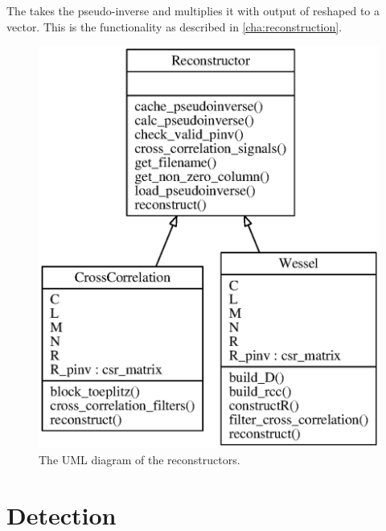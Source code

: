 \documentclass[a4paper, openany, oneside]{memoir}
\begin{document}
The  takes the pseudo-inverse and multiplies it with output of  reshaped to a vector. This is the functionality as described in \cref{cha:reconstruction}.

\begin{figure}
    \centering
    \includegraphics{./figures/classes_reconstruction.eps}
    \caption{The UML diagram of the reconstructors.}
    \label{fig:umlreconstructor}
\end{figure}

\section{Detection}
\label{sec:detection}
\end{document}
